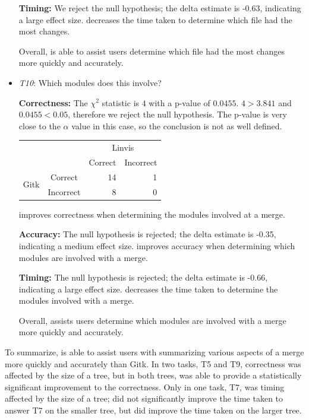 \begin{itemize}
    \textbf{Timing:} We reject the null hypothesis; the delta estimate
    is -0.63, indicating a large effect size. \tool decreases the time
    taken to determine which file had the most changes.

    Overall, \tool is able to assist users determine which file had the
    most changes more quickly and accurately.

  \item \emph{T10}: Which modules does this \mt involve?

    \textbf{Correctness:}
    The $\chi^2$ statistic is $4$ with a p-value of $0.0455$.
    $4 > 3.841$ and $0.0455 < 0.05$, therefore we reject the null
    hypothesis. The p-value is very close to the $\alpha$ value in this
    case, so the conclusion is not as well defined.

    \vspace{2mm}
    \begin{tabular}{cc|rr}
      &           & \multicolumn{2}{c}{Linvis}\\
      &           & Correct                      & Incorrect\\\hline
      \multirow{2}{*}{Gitk}   & Correct   & 14                           & 1\\
      & Incorrect & 8                            & 0\\
    \end{tabular}
    \vspace{3mm}

    \tool improves correctness when determining the modules involved at
    a merge.

    \textbf{Accuracy:} The null hypothesis is rejected; the delta
    estimate is -0.35, indicating a medium effect size. \tool improves
    accuracy when determining which modules are involved with a merge.

    \textbf{Timing:} The null hypothesis is rejected; the delta estimate
    is -0.66, indicating a large effect size. \tool decreases the time
    taken to determine the modules involved with a merge.

    Overall, \tool assists users determine which modules are involved
    with a merge more quickly and accurately.

\end{itemize}

To summarize, \tool is able to assist users with summarizing various
aspects of a merge more quickly and accurately than Gitk. In two tasks,
T5 and T9, correctness was affected by the size of a tree, but in both
trees, \tool was able to provide a statistically significant improvement
to the correctness. Only in one task, T7, was timing affected by the
size of a tree; \tool did not significantly improve the time taken to
answer T7 on the smaller tree, but did improve the time taken on the
larger tree.

